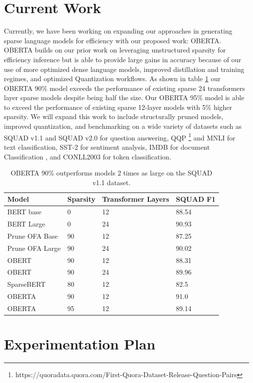 \section{Current Work}
Currently, we have been working on expanding our approaches in generating sparse language models for efficiency with our proposed work: OBERTA. OBERTA builds on our prior work on leveraging unstructured sparsity for efficiency inference but is able to provide large gains in accuracy because of our use of more optimized dense language models, improved distillation and training regimes, and optimized Quantization workflows. As shown in table \ref{tab:OBERTA-squad} our OBERTA 90\% model exceeds the performance of existing sparse 24 transformers layer sparse models despite being half the size. Our OBERTA 95\% model is able to exceed the performance of existing sparse 12-layer models with 5\% higher sparsity. We will expand this work to include structurally pruned models, improved quantization, and benchmarking on a wide variety of datasets such as SQUAD v1.1 \cite{Rajpurkar2016SQuAD10} and SQUAD v2.0 \cite{Rajpurkar2018KnowWY} for question answering, QQP \footnote{https://quoradata.quora.com/First-Quora-Dataset-Release-Question-Pairs} and MNLI \cite{Williams2018ABC} for  text classification, SST-2 \cite{Socher2013RecursiveDM} for sentiment analysis, IMDB for document Classification \cite{Maas2011LearningWV}, and CONLL2003 \cite{Sang2003IntroductionTT} for token classification.
\begin{table}[!ht]
    \centering
    \begin{tabular}{|l|l|l|l|}
    \hline
        Model & Sparsity & Transformer Layers & SQUAD F1  \\ \hline
        BERT base & 0 & 12 & 88.54  \\ \hline
        BERT Large & 0 & 24 & 90.93   \\ \hline
        Prune OFA Base & 90 & 12 & 87.25  \\ \hline
        Prune OFA Large & 90 & 24 & 90.02\\ \hline
        OBERT & 90 & 12 & 88.31 \\ \hline
        OBERT & 90 & 24 & 89.96  \\ \hline
        SparseBERT & 80 & 12 & 82.5  \\ \hline
        OBERTA & 90 & 12 & 91.0 \\ \hline
        OBERTA & 95 & 12 & 89.14  \\ \hline
    \end{tabular}
    \caption{OBERTA 90\% outperforms models 2 times as large on the SQUAD v1.1 dataset.}
    \label{tab:OBERTA-squad}
\end{table}

\section{Experimentation Plan}
